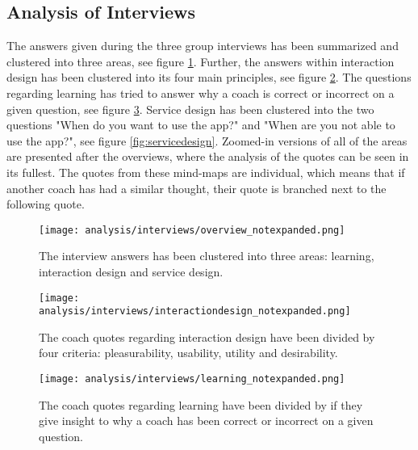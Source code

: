 \subsection{Analysis of Interviews}

The answers given during the three group interviews has been summarized and clustered into three areas, see figure \ref{fig:overview}. Further, the answers within interaction design has been clustered into its four main principles, see figure \ref{fig:interactiondesign}. The questions regarding learning has tried to answer why a coach is correct or incorrect on a given question, see figure \ref{fig:learning}. Service design has been clustered into the two questions "When do you want to use the app?" and "When are you not able to use the app?", see figure \ref{fig:servicedesign}. Zoomed-in versions of all of the areas are presented after the overviews, where the analysis of the quotes can be seen in its fullest. The quotes from these mind-maps are individual, which means that if another coach has had a similar thought, their quote is branched next to the following quote.

\begin{figure}[h]
    \centering
    \texttt{[image: analysis/interviews/overview\_notexpanded.png]}
    \caption{The interview answers has been clustered into three areas: learning, interaction design and service design.}
    \label{fig:overview}
\end{figure}

\begin{figure}[h]
    \centering
    \texttt{[image: analysis/interviews/interactiondesign\_notexpanded.png]}
    \caption{The coach quotes regarding interaction design have been divided by four criteria: pleasurability, usability, utility and desirability.}
    \label{fig:interactiondesign}
\end{figure}


\begin{figure}[h]
    \centering
    \texttt{[image: analysis/interviews/learning\_notexpanded.png]}
    \caption{The coach quotes regarding learning have been divided by if they give insight to why a coach has been correct or incorrect on a given question.}
    \label{fig:learning}
\end{figure}

